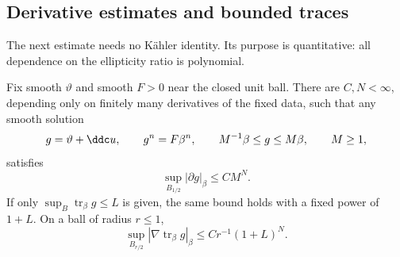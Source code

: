 \subsection{Derivative estimates and bounded traces}\label{sec:interior-calabi}

The next estimate needs no K\"ahler identity. Its purpose is quantitative: all dependence on the ellipticity ratio is polynomial.

\begin{proposition}\label{prop:interior-calabi}
Fix smooth $\vartheta$ and smooth $F>0$ near the closed unit ball. There are $C,N<\infty$, depending only on finitely many derivatives of the fixed data, such that any smooth solution
\[
  g=\vartheta+\ddc u,
  \qquad g^n=F\beta^n,
  \qquad M^{-1}\beta\leq g\leq M\beta,
  \qquad M\geq1,
\]
satisfies
\begin{equation}\label{eq:interior-calabi-polynomial}
  \sup_{B_{1/2}}|\partial g|_\beta\leq CM^N.
\end{equation}
If only $\sup_B\operatorname{tr}_\beta g\leq L$ is given, the same bound holds with a fixed power of $1+L$. On a ball of radius $r\leq1$,
\begin{equation}\label{eq:interior-gradient-trace-scaled}
  \sup_{B_{r/2}}|\nabla\operatorname{tr}_\beta g|_\beta
  \leq Cr^{-1}(1+L)^N.
\end{equation}
\end{proposition}

